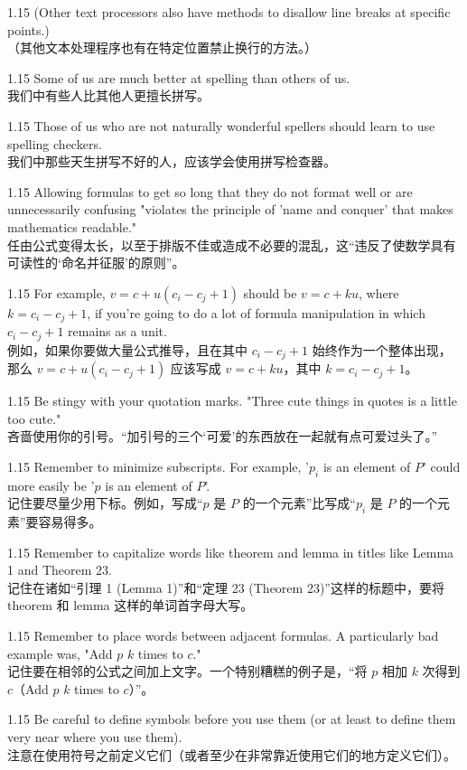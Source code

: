 \documentclass[12pt,a4paper]{article}
\newcommand{\bilingual}[2]{
    \begin{spacing}{1.15} %
        \noindent \normalsize #1 \\[-0.5ex] %
        \small \textcolor{blue!70!black}{#2} %
    \end{spacing}
    \vspace{0.8em} %
}
\begin{document}
\bilingual{(Other text processors also have methods to disallow line breaks at specific points.)}
{（其他文本处理程序也有在特定位置禁止换行的方法。）} %

\bilingual{Some of us are much better at spelling than others of us.}
{我们中有些人比其他人更擅长拼写。} %

\bilingual{Those of us who are not naturally wonderful spellers should learn to use spelling checkers.}
{我们中那些天生拼写不好的人，应该学会使用拼写检查器。} %

\bilingual{Allowing formulas to get so long that they do not format well or are unnecessarily confusing "violates the principle of 'name and conquer' that makes mathematics readable."}
{任由公式变得太长，以至于排版不佳或造成不必要的混乱，这“违反了使数学具有可读性的‘命名并征服’的原则”。} %

\bilingual{For example, $v=c+u(c_{i}-c_{j}+1)$ should be $v=c+ku$, where $k=c_{i}-c_{j}+1$, if you're going to do a lot of formula manipulation in which $c_{i}-c_{j}+1$ remains as a unit.}
{例如，如果你要做大量公式推导，且在其中 $c_{i}-c_{j}+1$ 始终作为一个整体出现，那么 $v=c+u(c_{i}-c_{j}+1)$ 应该写成 $v=c+ku$，其中 $k=c_{i}-c_{j}+1$。} %

\bilingual{Be stingy with your quotation marks. "Three cute things in quotes is a little too cute."}
{吝啬使用你的引号。“加引号的三个‘可爱’的东西放在一起就有点可爱过头了。”} %

\bilingual{Remember to minimize subscripts. For example, '$p_{i}$ is an element of $P$' could more easily be '$p$ is an element of $P$'.}
{记住要尽量少用下标。例如，写成“$p$ 是 $P$ 的一个元素”比写成“$p_{i}$ 是 $P$ 的一个元素”要容易得多。} %

\bilingual{Remember to capitalize words like theorem and lemma in titles like Lemma 1 and Theorem 23.}
{记住在诸如“引理 1 (Lemma 1)”和“定理 23 (Theorem 23)”这样的标题中，要将 theorem 和 lemma 这样的单词首字母大写。} %

\bilingual{Remember to place words between adjacent formulas. A particularly bad example was, "Add $p$ $k$ times to $c$."}
{记住要在相邻的公式之间加上文字。一个特别糟糕的例子是，“将 $p$ 相加 $k$ 次得到 $c$（Add $p$ $k$ times to $c$）”。} %

\bilingual{Be careful to define symbols before you use them (or at least to define them very near where you use them).}
{注意在使用符号之前定义它们（或者至少在非常靠近使用它们的地方定义它们）。} %
\end{document}
